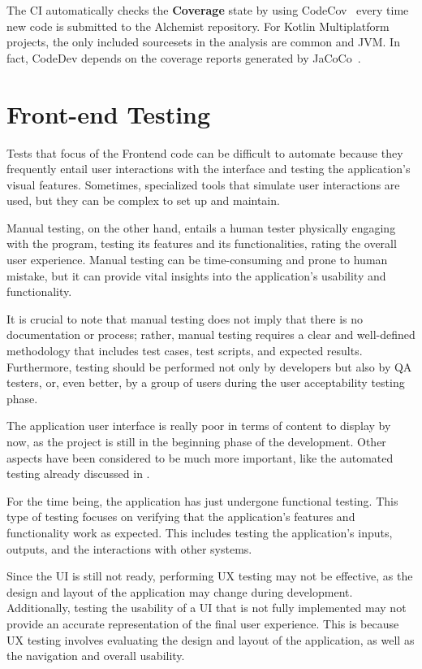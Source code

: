 The CI automatically checks the \textbf{Coverage} state by using CodeCov~\cite{CodecovT78:online} every time new code is submitted to the Alchemist repository. For Kotlin Multiplatform projects, the only included sourcesets in the analysis are common and JVM. In fact, CodeDev depends on the coverage reports generated by JaCoCo~\cite{EclEmmaJ37:online}.

\section{Front-end Testing}
\label{sec:front-end-testing}
Tests that focus of the Frontend code can be difficult to automate because they frequently entail user interactions with the interface and testing the application's visual features. Sometimes, specialized tools that simulate user interactions are used, but they can be complex to set up and maintain.\newline

Manual testing, on the other hand, entails a human tester physically engaging with the program, testing its features and its functionalities, rating the overall user experience. Manual testing can be time-consuming and prone to human mistake, but it can provide vital insights into the application's usability and functionality.\newline

It is crucial to note that manual testing does not imply that there is no documentation or process; rather, manual testing requires a clear and well-defined methodology that includes test cases, test scripts, and expected results. Furthermore, testing should be performed not only by developers but also by QA testers, or, even better, by a group of users during the user acceptability testing phase.\newline

The application user interface is really poor in terms of content to display by now, as the project is still in the beginning phase of the development. Other aspects have been considered to be much more important, like the automated testing already discussed in .\newline

For the time being, the application has just undergone functional testing. This type of testing focuses on verifying that the application's features and functionality work as expected. This includes testing the application's inputs, outputs, and the interactions with other systems.\newline

Since the UI is still not ready, performing UX testing may not be effective, as the design and layout of the application may change during development. Additionally, testing the usability of a UI that is not fully implemented may not provide an accurate representation of the final user experience. This is because UX testing involves evaluating the design and layout of the application, as well as the navigation and overall usability.
